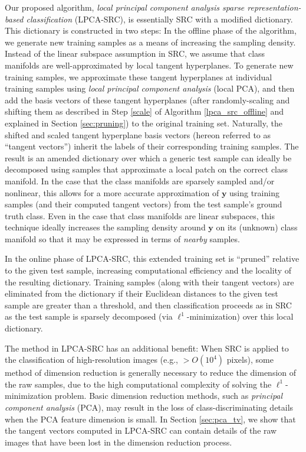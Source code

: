 \documentclass[review]{elsarticle}
\begin{document}
Our proposed algorithm, \emph{local principal component analysis sparse representation-based classification} (LPCA-SRC), is essentially SRC with a modified dictionary. This dictionary is constructed in two steps: In the offline phase of the algorithm, we generate new training samples as a means of increasing the sampling density. Instead of the linear subspace assumption in SRC, we assume that class manifolds are well-approximated by local tangent hyperplanes. To generate new training samples, we approximate these tangent hyperplanes at individual training samples using \emph{local principal component analysis} (local PCA), and then add the basis vectors of these tangent hyperplanes (after randomly-scaling and shifting them as described in Step \ref{scale} of Algorithm \ref{lpca_src_offline} and explained in Section \ref{sec:pruning}) to the original training set. Naturally, the shifted and scaled tangent hyperplane basis vectors (hereon referred to as ``tangent vectors'') inherit the labels of their corresponding training samples. The result is an amended dictionary over which a generic test sample can ideally be decomposed using samples that approximate a local patch on the correct class manifold. In the case that the class manifolds are sparsely sampled and/or nonlinear, this allows for a more accurate approximation of $\bm{y}$ using training samples (and their computed tangent vectors) from the test sample's ground truth class. Even in the case that class manifolds are linear subspaces, this technique ideally increases the sampling density around $\bm{y}$ on its (unknown) class manifold so that it may be expressed in terms of \emph{nearby} samples. 



In the online phase of LPCA-SRC, this extended training set is ``pruned'' relative to the given test sample, increasing computational efficiency and the locality of the resulting dictionary. Training samples (along with their tangent vectors) are eliminated from the dictionary if their Euclidean distances to the given test sample are greater than a threshold, and then classification proceeds as in SRC as the test sample is sparsely decomposed (via $\ell^1$-minimization) over this local dictionary.

The method in LPCA-SRC has an additional benefit: When SRC is applied to the classification of high-resolution images (e.g., $>O(10^4)$ pixels), some method of dimension reduction is generally necessary to reduce the dimension of the raw samples, due to the high computational complexity of solving the $\ell^1$-minimization problem. Basic dimension reduction methods, such as \emph{principal component analysis} (PCA), may result in the loss of class-discriminating details when the PCA feature dimension is small. In Section \ref{sec:pca_tv}, we show that the tangent vectors computed in LPCA-SRC can contain details of the raw images that have been lost in the dimension reduction process. 
\end{document}
